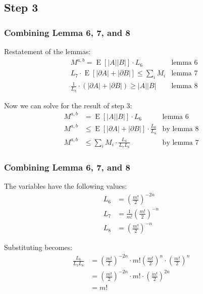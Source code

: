\documentclass[aspectratio=169]{beamer}
\DeclareMathOperator{\expectedvalue}{E}
\begin{document}
	\subsection{Step 3}
		\begin{frame}
			\frametitle{Combining Lemma 6, 7, and 8}

			Restatement of the lemmas:
			\begin{align*}
				&M^{a,b} = \expectedvalue[|A||B|] \cdot L_6 & \textrm{lemma 6} \\
				&L_7 \cdot \expectedvalue[|\partial A| + |\partial B|] \le \sum_i M_i & \textrm{lemma 7} \\
				&\frac{1}{L_8} \cdot (|\partial A| + |\partial B|) \ge |A||B| & \textrm{lemma 8}
			\end{align*}

			Now we can solve for the result of step 3:
			\begin{align*}
				M^{a,b} &= \expectedvalue[|A||B|] \cdot L_6 & \textrm{lemma 6} \\
				M^{a,b} &\le \expectedvalue[|\partial A| + |\partial B|] \cdot \frac{L_6}{L_8} & \textrm{by lemma 8} \\
				M^{a,b} &\le \sum_i M_i \cdot \frac{L_6}{L_7L_8} & \textrm{by lemma 7}
			\end{align*}

		\end{frame}

		\begin{frame}
			\frametitle{Combining Lemma 6, 7, and 8}

			The variables have the following values:
			\begin{align*}
				L_6 &= \left(\frac{m!}{2}\right)^{-2n} \\
				L_7 &= \frac{1}{m!}\left(\frac{m!}{2}\right)^{-n} \\
				L_8 &= \left(\frac{m!}{2}\right)^{-n}
			\end{align*}

			Substituting becomes:
			\begin{align*}
				\frac{L_6}{L_7L_8} &= \left(\frac{m!}{2}\right)^{-2n} \cdot m!\left(\frac{m!}{2}\right)^{n} \cdot \left(\frac{m!}{2}\right)^{n} \\
				&= \left(\frac{m!}{2}\right)^{-2n} \cdot m! \cdot \left(\frac{m!}{2}\right)^{2n} \\
				&= m!
			\end{align*}
		\end{frame}
\end{document}
